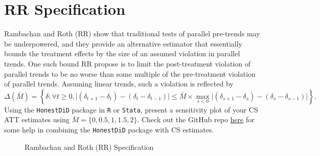 \documentclass[
  12pt,
]{article}
\begin{document}
\newpage

\hypertarget{rr-specification}{%
\section{RR Specification}\label{rr-specification}}

Rambachan and Roth (RR) show that traditional tests of parallel
pre-trends may be underpowered, and they provide an alternative
estimator that essentially bounds the treatment effects by the size of
an assumed violation in parallel trends. One such bound RR propose is to
limit the post-treatment violation of parallel trends to be no worse
than some multiple of the pre-treatment violation of parallel trends.
Assuming linear trends, such a violation is reflected by
\[\Delta(\bar{M}) = \left\{ \delta : \forall t \geq 0, \lvert (\delta_{t+1} - \delta_{t}) - (\delta_{t} - \delta_{t-1}) \rvert \leq \bar{M} \times \max_{s<0} \lvert (\delta_{s+1} - \delta_{s}) - (\delta_{s} - \delta_{s-1}) \rvert \right\}.\]
Using the \texttt{HonestDiD} package in \texttt{R} or \texttt{Stata},
present a sensitivity plot of your CS ATT estimates using
\(\bar{M} = \{0, 0.5, 1, 1.5, 2\}\). Check out the GitHub repo
\href{https://github.com/pedrohcgs/CS_RR}{here} for some help in
combining the \texttt{HonestDiD} package with CS estimates.

\begin{figure}
\caption{Rambachan and Roth (RR) Specification}\label{fig:Fig-6}
\end{figure}
\end{document}
